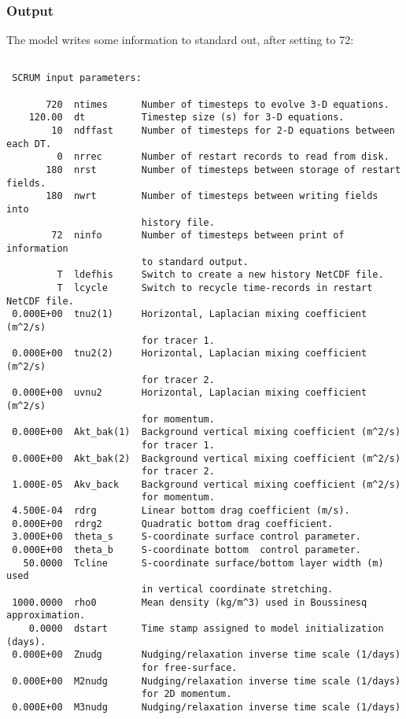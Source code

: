 \subsubsection{Output}
The model writes some information to standard out, after setting
 to 72:
\begin{verbatim}

 SCRUM input parameters:

       720  ntimes      Number of timesteps to evolve 3-D equations.
    120.00  dt          Timestep size (s) for 3-D equations.
        10  ndffast     Number of timesteps for 2-D equations between each DT.
         0  nrrec       Number of restart records to read from disk.
       180  nrst        Number of timesteps between storage of restart fields.
       180  nwrt        Number of timesteps between writing fields into
                        history file.
        72  ninfo       Number of timesteps between print of information
                        to standard output.
         T  ldefhis     Switch to create a new history NetCDF file.
         T  lcycle      Switch to recycle time-records in restart NetCDF file.
 0.000E+00  tnu2(1)     Horizontal, Laplacian mixing coefficient (m^2/s)
                        for tracer 1.
 0.000E+00  tnu2(2)     Horizontal, Laplacian mixing coefficient (m^2/s)
                        for tracer 2.
 0.000E+00  uvnu2       Horizontal, Laplacian mixing coefficient (m^2/s)
                        for momentum.
 0.000E+00  Akt_bak(1)  Background vertical mixing coefficient (m^2/s)
                        for tracer 1.
 0.000E+00  Akt_bak(2)  Background vertical mixing coefficient (m^2/s)
                        for tracer 2.
 1.000E-05  Akv_back    Background vertical mixing coefficient (m^2/s)
                        for momentum.
 4.500E-04  rdrg        Linear bottom drag coefficient (m/s).
 0.000E+00  rdrg2       Quadratic bottom drag coefficient.
 3.000E+00  theta_s     S-coordinate surface control parameter.
 0.000E+00  theta_b     S-coordinate bottom  control parameter.
   50.0000  Tcline      S-coordinate surface/bottom layer width (m) used
                        in vertical coordinate stretching.
 1000.0000  rho0        Mean density (kg/m^3) used in Boussinesq approximation.
    0.0000  dstart      Time stamp assigned to model initialization (days).
 0.000E+00  Znudg       Nudging/relaxation inverse time scale (1/days)
                        for free-surface.
 0.000E+00  M2nudg      Nudging/relaxation inverse time scale (1/days)
                        for 2D momentum.
 0.000E+00  M3nudg      Nudging/relaxation inverse time scale (1/days)

\end{verbatim}
